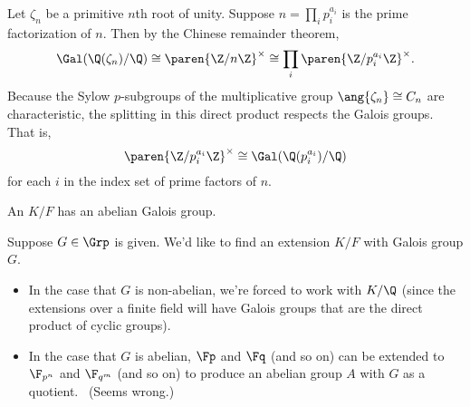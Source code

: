 
\newcommand{\gal}{\Gal(\Q(\zeta_n)/\Q)} 

\begin{ex}
    Let $\zeta_n$ be a primitive $n$th root of unity. 
    Suppose $n= \prod_i p_i^{a_i}$ is the prime factorization of $n$. 
    Then by the Chinese remainder theorem,
    \begin{equation*}
        \gal \cong \paren{\Z/n\Z}^\times \cong \prod_i \paren{\Z/{p_i^{a_i}}\Z}^\times.
    \end{equation*}
    Because the Sylow $p$-subgroups of the multiplicative group $\ang{\zeta_n} \cong C_n$ are characteristic, the splitting in this direct product respects the Galois groups. 
    That is, 
    \begin{equation*}\paren{\Z/{p_i^{a_i}}\Z}^\times \cong \Gal(\Q({p_i^{a_i}})/\Q)\end{equation*} 
    for each $i$ in the index set of prime factors of $n$.
\end{ex}

\begin{defn}
    An  $K/F$ has an abelian Galois group.
\end{defn}

Suppose $G \in \Grp$ is given.
We'd like to find an extension $K/F$ with Galois group $G$. 

\begin{itemize}
    \item In the case that $G$ is non-abelian, we're forced to work with $K/\Q$ (since the extensions over a finite field will have Galois groups that are the direct product of cyclic groups).
    \item In the case that $G$ is abelian, $\Fp$ and $\Fq$ (and so on) can be extended to $\F_{p^n}$ and $\F_{q^m}$ (and so on) to produce an abelian group $A$ with $G$ as a quotient. \TODO\ (Seems wrong.)
\end{itemize}

